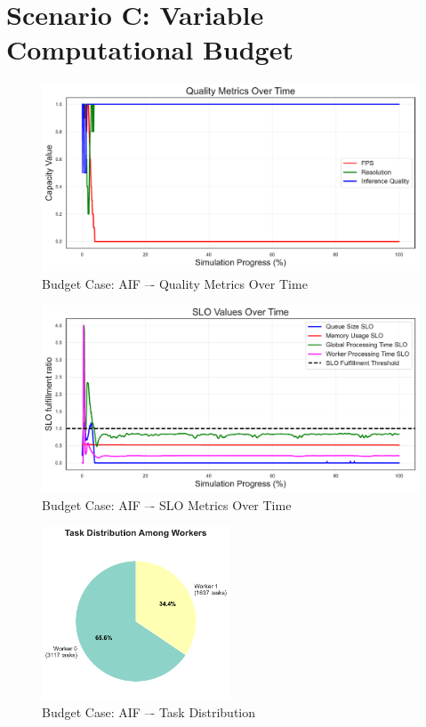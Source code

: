 \clearpage
\section{Scenario C: Variable Computational Budget}



\begin{figure}[h]
    \centering
    \includegraphics[width=\textwidth]{img/results/variable_computational_budget/active_inference_relative_control_quality_metrics.pdf}
    \caption{Budget Case: AIF –- Quality Metrics Over Time}
\end{figure}
\begin{figure}[h]
    \centering
    \includegraphics[width=\textwidth]{img/results/variable_computational_budget/active_inference_relative_control_slo_values.pdf}
    \caption{Budget Case: AIF –- SLO Metrics Over Time}
\end{figure}
\begin{figure}[h]
    \centering
    \includegraphics[width=0.5\textwidth]{img/results/variable_computational_budget/active_inference_relative_control_task_distribution_pie.pdf}
    \caption{Budget Case: AIF –- Task Distribution}
\end{figure}


